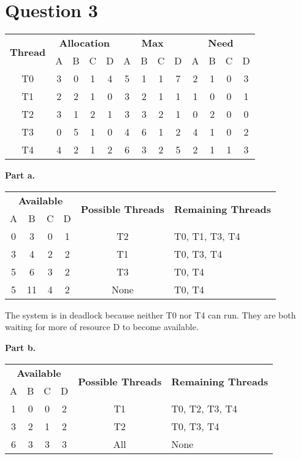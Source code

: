 \documentclass[a4paper]{article}
\begin{document}
	\section{Question 3}
	\begin{center}
		\begin{tabular}{| c || cccc || cccc || cccc |}
			\hline
			\multirow{2}{*}{\textbf{Thread}} &
			\multicolumn{4}{|c||}{\textbf{Allocation}} &
			\multicolumn{4}{c||}{\textbf{Max}} &
			\multicolumn{4}{c|}{\textbf{Need}} \\
			 & A & B & C & D & A & B & C & D & A & B & C & D \\
			\hline \hline
			T0     & 3 & 0 & 1 & 4 & 5 & 1 & 1 & 7 & 2 & 1 & 0 & 3 \\
			T1     & 2 & 2 & 1 & 0 & 3 & 2 & 1 & 1 & 1 & 0 & 0 & 1 \\
			T2     & 3 & 1 & 2 & 1 & 3 & 3 & 2 & 1 & 0 & 2 & 0 & 0 \\
			T3     & 0 & 5 & 1 & 0 & 4 & 6 & 1 & 2 & 4 & 1 & 0 & 2 \\
			T4     & 4 & 2 & 1 & 2 & 6 & 3 & 2 & 5 & 2 & 1 & 1 & 3 \\
			\hline
		\end{tabular}
	\end{center}
	\par \textbf{Part a.}
	\begin{center}
		\begin{tabular}{| cccc || c || l |}
			\hline
			\multicolumn{4}{|c||}{\textbf{Available}} &
			\multirow{2}{4.1em}{\textbf{Possible Threads}} &
			\multirow{2}{6em}{\textbf{Remaining Threads}} \\
			A & B & C & D &  &  \\
			\hline \hline
			0 & 3 & 0 & 1 & T2 & T0, T1, T3, T4 \\
			\hline
			3 & 4 & 2 & 2 & T1 & T0, T3, T4 \\
			\hline
			5 & 6 & 3 & 2 & T3 & T0, T4 \\
			\hline
			5 & 11 & 4 & 2 & None & T0, T4 \\
			\hline
		\end{tabular}
	\end{center}
	\par The system is in deadlock because neither T0 nor T4 can run.
	They are both waiting for more of resource D to become available.
	\par \textbf{Part b.}
	\begin{center}
		\begin{tabular}{| cccc || c || l |}
			\hline
			\multicolumn{4}{|c||}{\textbf{Available}} &
			\multirow{2}{4.1em}{\textbf{Possible Threads}} &
			\multirow{2}{6em}{\textbf{Remaining Threads}} \\
			A & B & C & D &  &  \\
			\hline \hline
			1 & 0 & 0 & 2 & T1 & T0, T2, T3, T4 \\
			\hline
			3 & 2 & 1 & 2 & T2 & T0, T3, T4 \\
			\hline
			6 & 3 & 3 & 3 & All & None \\
			\hline
		\end{tabular}
	\end{center}
\end{document}
